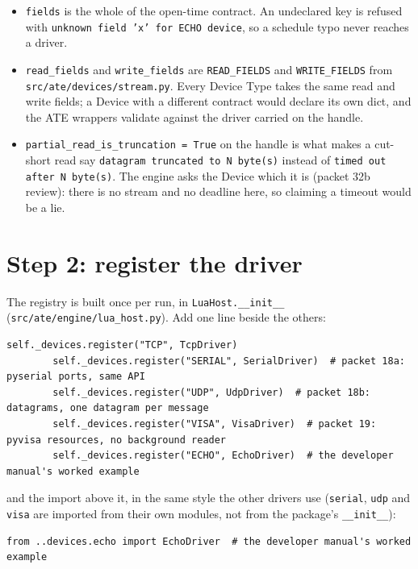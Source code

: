 \begin{itemize}
  \item \texttt{fields} is the whole of the open-time contract. An undeclared key is refused with
    \texttt{unknown field 'x' for ECHO device}, so a schedule typo never reaches a driver.
  \item \texttt{read\_fields} and \texttt{write\_fields} are \texttt{READ\_FIELDS} and
    \texttt{WRITE\_FIELDS} from \texttt{src/\allowbreak{}ate/\allowbreak{}devices/\allowbreak{}stream.py}. Every Device Type takes the same
    read and write fields; a Device with a different contract would declare its own dict, and the
    ATE wrappers validate against the driver carried on the handle.
  \item \texttt{partial\_\allowbreak{}read\_\allowbreak{}is\_\allowbreak{}truncation = True} on the handle is what makes a cut-short read
    say \texttt{datagram truncated to N byte(s)} instead of \texttt{timed out after N byte(s)}. The
    engine asks the Device which it is (packet 32b review): there is no stream and no deadline here,
    so claiming a timeout would be a lie.
\end{itemize}

\section{Step 2: register the driver}

The registry is built once per run, in \texttt{LuaHost.\_\_init\_\_}
(\texttt{src/\allowbreak{}ate/\allowbreak{}engine/\allowbreak{}lua\_\allowbreak{}host.py}). Add one line beside the others:

\begin{lstlisting}[language=ATEPython]
        self._devices.register("TCP", TcpDriver)
        self._devices.register("SERIAL", SerialDriver)  # packet 18a: pyserial ports, same API
        self._devices.register("UDP", UdpDriver)  # packet 18b: datagrams, one datagram per message
        self._devices.register("VISA", VisaDriver)  # packet 19: pyvisa resources, no background reader
        self._devices.register("ECHO", EchoDriver)  # the developer manual's worked example
\end{lstlisting}

and the import above it, in the same style the other drivers use
(\texttt{serial}, \texttt{udp} and \texttt{visa} are imported from their own modules, not from the
package's \texttt{\_\_init\_\_}):

\begin{lstlisting}[language=ATEPython]
from ..devices.echo import EchoDriver  # the developer manual's worked example
\end{lstlisting}

